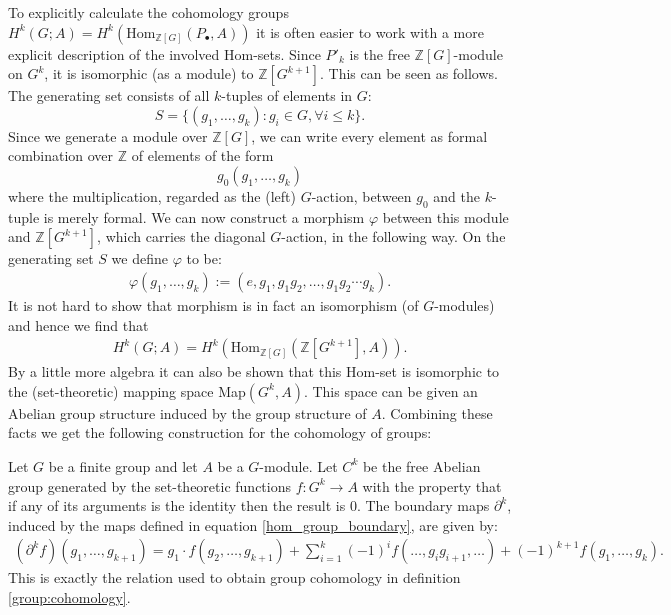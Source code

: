 	To explicitly calculate the cohomology groups $H^k(G; A) = H^k(\text{Hom}_{\mathbb{Z}[G]}(P_\bullet, A))$ it is often easier to work with a more explicit description of the involved Hom-sets. Since $P'_k$ is the free $\mathbb{Z}[G]$-module on $G^k$, it is isomorphic (as a module) to $\mathbb{Z}[G^{k+1}]$. This can be seen as follows. The generating set consists of all $k$-tuples of elements in $G$: \[S = \{(g_1, \ldots, g_k): g_i\in G, \forall i\leq k\}.\] Since we generate a module over $\mathbb{Z}[G]$, we can write every element as formal combination over $\mathbb{Z}$ of elements of the form \[g_0(g_1, \ldots, g_k)\] where the multiplication, regarded as the (left) $G$-action, between $g_0$ and the $k$-tuple is merely formal. We can now construct a morphism $\varphi$ between this module and $\mathbb{Z}[G^{k+1}]$, which carries the diagonal $G$-action, in the following way. On the generating set $S$ we define $\varphi$ to be:
	\begin{gather}
		\varphi(g_1, \ldots, g_k) := (e, g_1, g_1g_2, \ldots, g_1g_2\cdots g_k).
	\end{gather}
	It is not hard to show that morphism is in fact an isomorphism (of $G$-modules) and hence we find that
	\begin{gather}
		H^k(G; A) = H^k(\text{Hom}_{\mathbb{Z}[G]}(\mathbb{Z}[G^{k+1}], A)).
	\end{gather}
	By a little more algebra it can also be shown that this Hom-set is isomorphic to the (set-theoretic) mapping space Map$(G^k, A)$. This space can be given an Abelian group structure induced by the group structure of $A$. Combining these facts we get the following construction for the cohomology of groups:
	\begin{construct}
		Let $G$ be a finite group and let $A$ be a $G$-module. Let $C^k$ be the free Abelian group generated by the set-theoretic functions $f:G^k\rightarrow A$ with the property that if any of its arguments is the identity then the result is 0. The boundary maps $\partial^k$, induced by the maps defined in equation \ref{hom_group_boundary}, are given by:
		\begin{gather}
			(\partial^k f)(g_1, \ldots, g_{k+1}) = g_1\cdot f(g_2, \ldots, g_{k+1}) + \sum_{i=1}^k(-1)^if(\ldots, g_ig_{i+1}, \ldots) + (-1)^{k+1}f(g_1, \ldots, g_k).
		\end{gather}
		This is exactly the relation used to obtain group cohomology in definition \ref{group:cohomology}.
	\end{construct}

